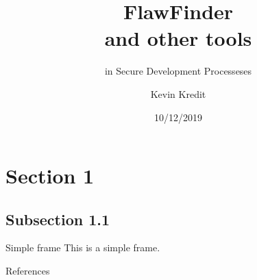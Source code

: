 \documentclass{beamer}
\title{FlawFinder \\ and other tools}
\subtitle{in Secure Development Processeses}
\author{Kevin Kredit}
\institute{GVSU \\ CIS 618}
\date{10/12/2019}
\begin{document}
  \begin{frame}
    \maketitle
  \end{frame}



\section{Section 1}

\subsection{Subsection 1.1}
  \begin{frame}{Simple frame}
    This is a simple frame.
  \end{frame}

\appendix
  \begin{frame}{References}
    \nocite{*}
    
    
  \end{frame}
\end{document}
